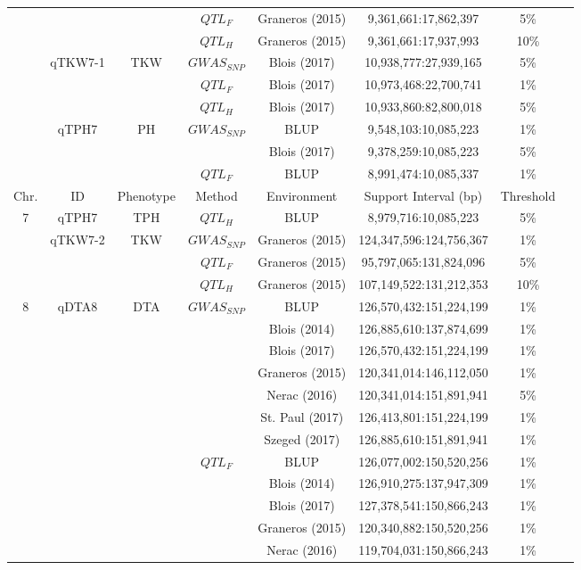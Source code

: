 \documentclass[9pt,twocolumn,twoside]{gsag3jnl}
\begin{document}
\begin{longtable}{c c c c c c c c}
&  & & $QTL_F$ & Graneros (2015) & 9,361,661:17,862,397 & 5\% \\
&  & & $QTL_H$ & Graneros (2015) & 9,361,661:17,937,993 & 10\% \\
& qTKW7-1 & TKW & $GWAS_{SNP}$ & Blois (2017) & 10,938,777:27,939,165 & 5\% \\
&  & & $QTL_F$ & Blois (2017) &  10,973,468:22,700,741 & 1\% \\
&  & & $QTL_H$ & Blois (2017) &  10,933,860:82,800,018 & 5\% \\
&  qTPH7 & PH & $GWAS_{SNP}$ & BLUP & 9,548,103:10,085,223 & 1\% \\
&  & & & Blois (2017) & 9,378,259:10,085,223 & 5\% \\
&  & & $QTL_F$ & BLUP & 8,991,474:10,085,337 & 1\% \\
\hline \hline
Chr. & ID & Phenotype & Method & Environment & Support Interval (bp) & Threshold\\
\hline
7 & qTPH7 & TPH & $QTL_H$ & BLUP & 8,979,716:10,085,223 & 5\% \\
&  qTKW7-2 & TKW & $GWAS_{SNP}$ & Graneros (2015) & 124,347,596:124,756,367 & 1\% \\
&  & & $QTL_F$ & Graneros (2015) & 95,797,065:131,824,096 & 5\% \\
&  & & $QTL_H$ & Graneros (2015)  & 107,149,522:131,212,353 & 10\% \\
\hline
8  & qDTA8 & DTA & $GWAS_{SNP}$ & BLUP & 126,570,432:151,224,199 & 1\% \\
&  & & & Blois (2014) & 126,885,610:137,874,699 & 1\% \\
&  & & & Blois (2017) & 126,570,432:151,224,199 & 1\% \\
&  & & & Graneros (2015) & 120,341,014:146,112,050 & 1\% \\
&  & & & Nerac (2016) & 120,341,014:151,891,941 & 5\% \\
&  & & & St. Paul (2017) & 126,413,801:151,224,199 & 1\% \\
&  & & & Szeged (2017) & 126,885,610:151,891,941 & 1\% \\
&  & & $QTL_F$ & BLUP & 126,077,002:150,520,256 & 1\% \\
&  & & & Blois (2014) & 126,910,275:137,947,309 & 1\% \\
&  & & & Blois (2017) & 127,378,541:150,866,243 & 1\% \\
&  & & & Graneros (2015) & 120,340,882:150,520,256 & 1\% \\
&  & & & Nerac (2016) & 119,704,031:150,866,243 & 1\% \\


\end{longtable}
\end{document}
